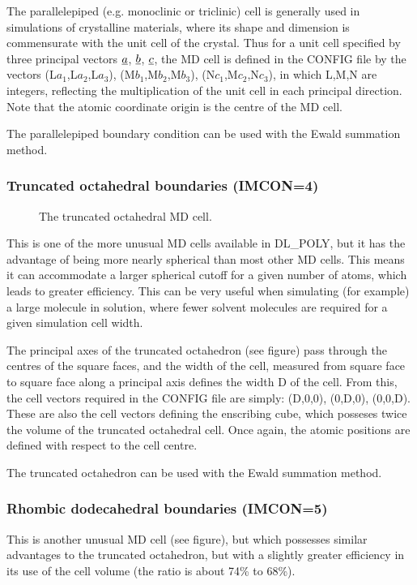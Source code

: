 The parallelepiped (e.g. monoclinic or triclinic) cell is generally
used in simulations of crystalline materials, where its shape and
dimension is commensurate with the unit cell of the
crystal. Thus for a unit cell specified by three principal vectors
$\mbox{$\underline{a}$}$, $\mbox{$\underline{b}$}$, $\mbox{$\underline{c}$}$, the MD cell is defined in the \D{}
CONFIG file by the vectors (L$a_{1}$,L$a_{2}$,L$a_{3}$),
(M$b_{1}$,M$b_{2}$,M$b_{3}$), (N$c_{1}$,M$c_{2}$,N$c_{3}$), in which
L,M,N are integers, reflecting the multiplication of the unit cell in
each principal direction. Note that the atomic coordinate origin is
the centre of the MD cell.

The parallelepiped boundary condition can be used with the Ewald summation
method.

\subsubsection*{Truncated octahedral boundaries (IMCON=4)}

\begin{figure}[ht]
\begin{center}
\centerline{}
\caption{The truncated octahedral MD cell.}
\end{center}
\end{figure}

This is one of the more unusual MD cells available in DL\_POLY, but it
has the advantage of being more nearly spherical than most other MD
cells. This means it can accommodate a larger spherical cutoff for a
given number of atoms, which leads to greater efficiency. This can be
very useful when simulating (for example) a large molecule in
solution, where fewer solvent molecules are required for a given
simulation cell width.

The principal axes of the truncated octahedron (see figure) pass
through the centres of the square faces, and the width of the cell,
measured from square face to square face along a principal axis
defines the width D of the cell. From this, the cell vectors required
in the \D{} CONFIG file are simply: (D,0,0), (0,D,0), (0,0,D). These are
also the cell vectors defining the enscribing cube, which posseses
twice the volume of the truncated octahedral cell.  Once again, the
atomic positions are defined with respect to the cell centre.

The truncated octahedron can be used with the Ewald summation method.

\subsubsection*{Rhombic dodecahedral boundaries (IMCON=5)}
This is another unusual MD cell (see figure), but which possesses
similar advantages to the truncated octahedron, but with a slightly
greater efficiency in its use of the cell volume (the ratio is about
74\% to 68\%).

